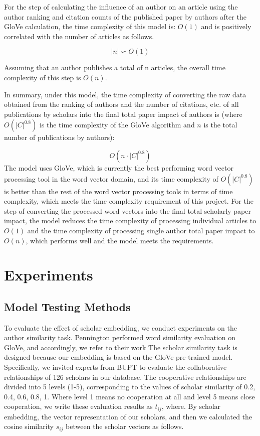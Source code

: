 \documentclass[conference]{IEEEtran}
\begin{document}
For the step of calculating the influence of an author on an article
using the author ranking and citation counts of the published paper
by authors after the GloVe calculation, the time complexity of this
model is: \(O(1)\) and is positively correlated with the number of
articles as follows.

\begin{equation}\label{eq:A}
    \mid n \mid \backsim O(1)
\end{equation}

Assuming that an author publishes a total of n articles, the overall
time complexity of this step is \(O(n)\).

In summary, under this model, the time complexity of converting the raw
data obtained from the ranking of authors and the number of citations,
etc. of all publications by scholars into the final total paper
impact of authors is (where \(O(|C|^{0.8})\) is the time complexity of
the GloVe algorithm and \(n\) is the total number of publications by
authors):

\begin{equation}\label{eq:A}
    O(n \cdot |C|^{0.8})
\end{equation}
The model uses GloVe, which is currently the best performing word vector
processing tool in the word vector domain, and its time complexity of
\(O(|C|^{0.8})\) is better than the rest of the word vector processing
tools in terms of time complexity, which meets the time complexity
requirement of this project. For the step of converting the processed
word vectors into the final total scholarly paper impact, the model
reduces the time complexity of processing individual articles to
\(O(1)\) and the time complexity of processing single author total
paper impact to \(O(n)\), which performs well and the model meets
the requirements.



\section{Experiments}
\subsection{Model Testing Methods}

To evaluate the effect of scholar embedding, we conduct experiments on
the author similarity task. Pennington \cite{GloVe}
performed word similarity evaluation \cite{https://doi.org/10.48550/arxiv.2211.08203} on GloVe, and accordingly, we refer
to their work The scholar similarity task is designed because our
embedding is based on the GloVe pre-trained model. Specifically, we
invited experts from BUPT to evaluate the collaborative relationships of 126 scholars in our
database. The cooperative relationships are divided into 5 levels (1-5), corresponding to the values of scholar similarity of 0.2, 0.4,
0.6, 0.8, 1. Where level 1 means no cooperation at all and level 5 means
close cooperation, we write these evaluation results as \(t_{ij}\),
where. By scholar embedding, the vector representation of our scholars,
and then we calculated the cosine similarity \(s_{ij}\) between the
scholar vectors as follows.
\end{document}
